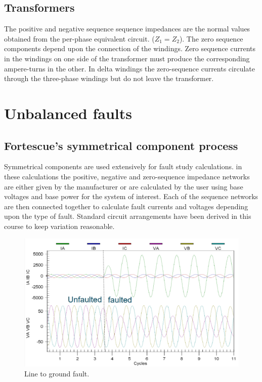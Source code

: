 \documentclass[class=report, crop=false, 12pt,a4paper]{standalone}
\begin{document}
\subsection{Transformers}
The positive and negative sequence sequence impedances are the normal values obtained from the per-phase equivalent circuit. ($Z_1 = Z_2$). The zero sequence components depend upon the connection of the windings. Zero sequence currents in the windings on one side of the transformer must produce the corresponding ampere-turns in the other. In delta windings the zero-sequence currents circulate through the three-phase windings but do not leave the transformer.
\section{Unbalanced faults}
\subsection{Fortescue's symmetrical component process}
Symmetrical components are used extensively for fault study calculations. in these calculations the positive, negative and zero-sequence impedance networks are either given by the manufacturer or are calculated by the user using base voltages and base power for the system of interest. Each of the sequence networks are then connected together to calculate fault currents and voltages depending upon the type of fault. Standard circuit arrangements have been derived in this course to keep variation reasonable. 
\begin{figure}[H]
	\centering
	\includegraphics[width = \textwidth]{../img/figure35.png}
	\caption{Line to ground fault.}
\end{figure}
\end{document}

